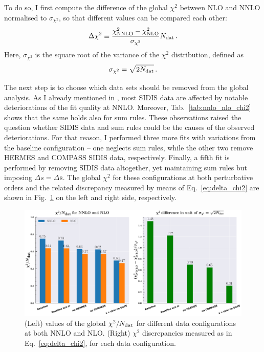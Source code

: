 To do so, I first compute the difference of the global $\chi^2$ between NLO and NNLO normalised to $\sigma_{\chi^2}$, so that different values can be compared each other:
%
\begin{equation}
  \Delta \chi^2 \equiv \frac{\chi^2_{\textrm{NNLO}} - \chi^2_{\textrm{NLO}}}{\sigma_{\chi^2}} N_{\textrm{dat}}\,.
  \label{eq:delta_chi2}
\end{equation}
%
Here, $\sigma_{\chi^2}$ is the square root of the variance of the $\chi^2$ distribution, defined as
%
\begin{equation}
  \sigma_{\chi^2} = \sqrt{2 N_{\textrm{dat}}}\,.
\end{equation}
%

The next step is to choose which data sets should be removed from the global analysis. As I already mentioned in , most SIDIS data are affected by notable deteriorations of the fit quality at NNLO. Moreover, Tab.~\ref{tab:nnlo_nlo_chi2} shows that the same holds also for sum rules. These observations raised the question whether SIDIS data and sum rules could be the causes of the observed deteriorations. For that reason, I performed three more fits with variations from the baseline configuration -- one neglects sum rules, while the other two remove HERMES and COMPASS SIDIS data, respectively. Finally, a fifth fit is performed by removing SIDIS data altogether, yet maintaining sum rules but imposing $\Delta s = \Delta \bar{s}$. The global $\chi^2$ for these configurations at both perturbative orders and the related discrepancy measured by means of Eq.~\eqref{eq:delta_chi2} are shown in Fig.~\ref{fig:discrepancy} on the left and right side, respectively.%

\begin{figure}[t]
  \centering
  \includegraphics[width=\textwidth]{Chapters/Chapter_4/figs/chi2_discrepancy.pdf}
  \caption{\small{(Left) values of the global $\chi^2 / N_{\textrm{dat}}$ for different data configurations at both NNLO and NLO. (Right) $\chi^2$ discrepancies measured as in Eq.~\eqref{eq:delta_chi2}, for each data configuration.}}
  \label{fig:discrepancy}
\end{figure}

